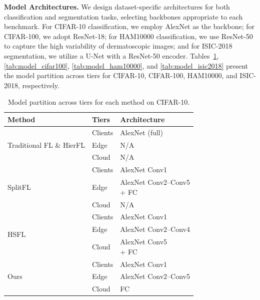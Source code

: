 \documentclass[letterpaper]{article} %
\begin{document}
    \noindent\textbf{Model Architectures.} We design dataset-specific architectures for both classification and segmentation tasks, selecting backbones appropriate to each benchmark. For CIFAR-10 classification, we employ AlexNet as the backbone; for CIFAR-100, we adopt ResNet-18; for HAM10000 classification, we use ResNet-50 to capture the high variability of dermatoscopic images; and for ISIC-2018 segmentation, we utilize a U-Net with a ResNet-50 encoder. Tables~\ref{tab:model_cifar10}, \ref{tab:model_cifar100}, \ref{tab:model_ham10000}, and \ref{tab:model_isic2018} present the model partition across tiers for CIFAR-10, CIFAR-100, HAM10000, and ISIC-2018, respectively.
        \begin{table}
            \centering
            \small
            \begin{tabular}{l|l|l}
            \hline
            \textbf{Method} & \textbf{Tiers} & \textbf{Architecture} \\
            \hline
            \multirow{3}{*}{Traditional FL \& HierFL} 
            & Clients & AlexNet (full) \\
            & Edge & N/A \\
            & Cloud & N/A \\
            \hline
            \multirow{3}{*}{SplitFL} 
            & Clients & AlexNet Conv1 \\
            & Edge & \makecell[l]{AlexNet Conv2--Conv5 \\ + FC} \\
            & Cloud & N/A \\
            \hline
            \multirow{3}{*}{HSFL} 
            & Clients & AlexNet Conv1 \\
            & Edge & AlexNet Conv2--Conv4 \\
            & Cloud & \makecell[l]{AlexNet Conv5 \\ + FC} \\
            \hline
            \multirow{3}{*}{Ours} 
            & Clients & AlexNet Conv1 \\
            & Edge & AlexNet Conv2--Conv5 \\
            & Cloud & FC \\ \hline
            \end{tabular}
            \caption{Model partition across tiers for each method on CIFAR-10.}
            \label{tab:model_cifar10}
        \end{table}
        
\end{document}

